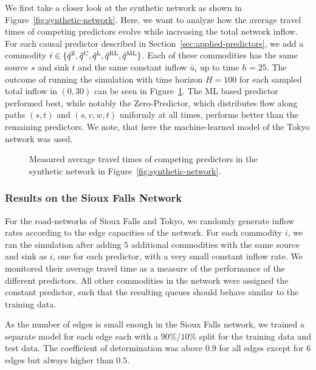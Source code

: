 We first take a closer look at the synthetic network as shown in Figure~\ref{fig:synthetic-network}.
Here, we want to analyze how the average travel times of competing predictors evolve while increasing the total network inflow. 
For each causal predictor described in Section~\ref{sec:applied-predictors}, we add a commodity $i\in\{\hat q^{\text{Z}}, \hat q^{\text{C}}, \hat q^{\text{L}}, \hat q^{\text{RL}}, \hat q^{\text{ML}} \}$.
Each of these commodities has the same source $s$ and sink $t$ and the same constant inflow $\bar u_i$ up to time $h=25$.
The outcome of running the simulation with time horizon $H=100$ for each sampled total inflow in $(0, 30)$ can be seen in Figure~\ref{fig:synthetic-travel-times}.
The ML based predictor performed best, while notably the Zero-Predictor, which distributes flow along paths $(s,t)$ and $(s,v,w,t)$ uniformly at all times, performs better than the remaining predictors.
We note, that here the machine-learned model of the Tokyo network was used.

\begin{figure}[hb]
    \centering
    
    \caption{Measured average travel times of competing predictors in the synthetic network in Figure~\ref{fig:synthetic-network}.}\label{fig:synthetic-travel-times}
\end{figure}



\subsubsection*{Results on the Sioux Falls Network}

For the road-networks of Sioux Falls and Tokyo, we randomly generate inflow rates according to the edge capacities of the network.
For each commodity $i$, we ran the simulation after adding $5$ additional commodities with the same source and sink as $i$, one for each predictor, with a very small constant inflow rate.
We monitored their average travel time as a measure of the performance of the different predictors.
All other commodities in the network were assigned the constant predictor, such that the resulting queues should behave similar to the training data.

As the number of edges is small enough in the Sioux Falls network, we trained a separate model for each edge each with a $90\% / 10\%$ split for the training data and test data.
The coefficient of determination was above $0{.}9$ for all edges except for $6$ edges but always higher than $0{.}5$.

